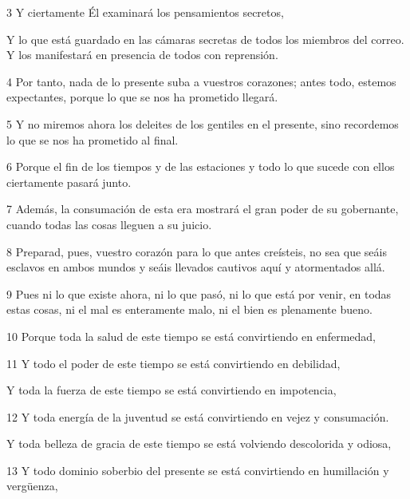 \par 3 Y ciertamente Él examinará los pensamientos secretos,

\par Y lo que está guardado en las cámaras secretas de todos los miembros del correo. Y los manifestará en presencia de todos con reprensión.

\par 4 Por tanto, nada de lo presente suba a vuestros corazones; antes todo, estemos expectantes, porque lo que se nos ha prometido llegará.

\par 5 Y no miremos ahora los deleites de los gentiles en el presente, sino recordemos lo que se nos ha prometido al final.

\par 6 Porque el fin de los tiempos y de las estaciones y todo lo que sucede con ellos ciertamente pasará junto.

\par 7 Además, la consumación de esta era mostrará el gran poder de su gobernante, cuando todas las cosas lleguen a su juicio.

\par 8 Preparad, pues, vuestro corazón para lo que antes creísteis, no sea que seáis esclavos en ambos mundos y seáis llevados cautivos aquí y atormentados allá.

\par 9 Pues ni lo que existe ahora, ni lo que pasó, ni lo que está por venir, en todas estas cosas, ni el mal es enteramente malo, ni el bien es plenamente bueno.

\par 10 Porque toda la salud de este tiempo se está convirtiendo en enfermedad,

\par 11 Y todo el poder de este tiempo se está convirtiendo en debilidad,

\par Y toda la fuerza de este tiempo se está convirtiendo en impotencia,

\par 12 Y toda energía de la juventud se está convirtiendo en vejez y consumación.

\par Y toda belleza de gracia de este tiempo se está volviendo descolorida y odiosa,

\par 13 Y todo dominio soberbio del presente se está convirtiendo en humillación y vergüenza,

